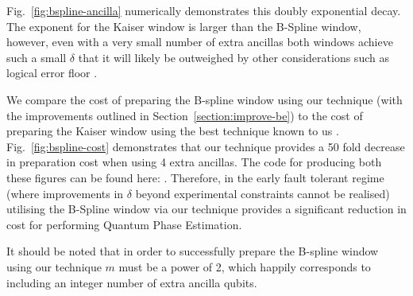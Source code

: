 \documentclass[a4paper,twocolumn,,accepted=2025-05-27]{quantumarticle}
\theoremstyle{empty}
\begin{document}
Fig.~\ref{fig:bspline-ancilla} numerically demonstrates this doubly exponential decay. The exponent for the Kaiser window is larger than the B-Spline window, however, even with a very small number of extra ancillas both windows achieve such a small $\delta$ that it will likely be outweighed by other considerations such as logical error floor \cite{Acharya:2024btg}.

We compare the cost of preparing the B-spline window using our technique (with the improvements outlined in Section~\ref{section:improve-be}) to the cost of preparing the Kaiser window using the best technique known to us \cite{mcardleQuantumStatePreparation2022, Greenaway:2024jzs}. Fig.~\ref{fig:bspline-cost} demonstrates that our technique provides a 50 fold decrease in preparation cost when using 4 extra ancillas. The code for producing both these figures can be found here: \cite{o_brien_2025_14794186}. Therefore, in the early fault tolerant regime (where improvements in $\delta$ beyond experimental constraints cannot be realised) utilising the B-Spline window via our technique provides a significant reduction in cost for performing Quantum Phase Estimation.

It should be noted that in order to successfully prepare the B-spline window using our technique $m$ must be a power of 2, which happily corresponds to including an integer number of extra ancilla qubits.
\end{document}
